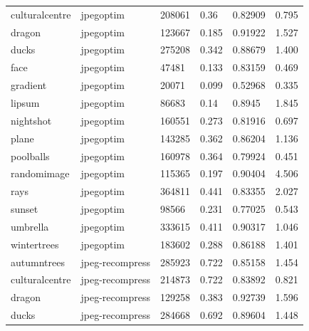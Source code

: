 \documentclass[12pt]{article}
\begin{document}
{\begin{longtable}{llllll}
	culturalcentre & jpegoptim        & 208061       & 0.36               & 0.82909   & 0.795                \\
	dragon         & jpegoptim        & 123667       & 0.185              & 0.91922   & 1.527                \\
	ducks          & jpegoptim        & 275208       & 0.342              & 0.88679   & 1.400                \\
	face           & jpegoptim        & 47481        & 0.133              & 0.83159   & 0.469                \\
	gradient       & jpegoptim        & 20071        & 0.099              & 0.52968   & 0.335                \\
	lipsum         & jpegoptim        & 86683        & 0.14               & 0.8945    & 1.845                \\
	nightshot      & jpegoptim        & 160551       & 0.273              & 0.81916   & 0.697                \\
	plane          & jpegoptim        & 143285       & 0.362              & 0.86204   & 1.136                \\
	poolballs      & jpegoptim        & 160978       & 0.364              & 0.79924   & 0.451                \\
	randomimage    & jpegoptim        & 115365       & 0.197              & 0.90404   & 4.506                \\
	rays           & jpegoptim        & 364811       & 0.441              & 0.83355   & 2.027                \\
	sunset         & jpegoptim        & 98566        & 0.231              & 0.77025   & 0.543                \\
	umbrella       & jpegoptim        & 333615       & 0.411              & 0.90317   & 1.046                \\
	wintertrees    & jpegoptim        & 183602       & 0.288              & 0.86188   & 1.401                \\
	autumntrees    & jpeg-recompress  & 285923       & 0.722              & 0.85158   & 1.454                \\
	culturalcentre & jpeg-recompress  & 214873       & 0.722              & 0.83892   & 0.821                \\
	dragon         & jpeg-recompress  & 129258       & 0.383              & 0.92739   & 1.596                \\
	ducks          & jpeg-recompress  & 284668       & 0.692              & 0.89604   & 1.448                \\

\end{longtable}}
\end{document}
